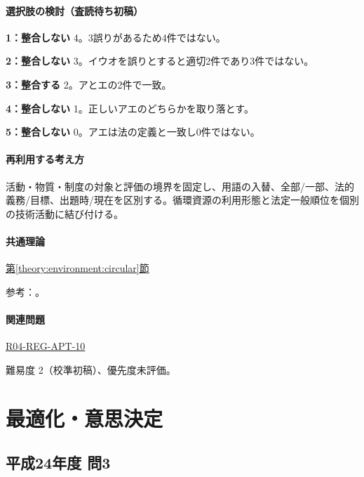 \paragraph{選択肢の検討（査読待ち初稿）}\mbox{}\par

\noindent\textbf{1：整合しない} 4。3誤りがあるため4件ではない。\par

\noindent\textbf{2：整合しない} 3。イウオを誤りとすると適切2件であり3件ではない。\par

\noindent\textbf{3：整合する} 2。アとエの2件で一致。\par

\noindent\textbf{4：整合しない} 1。正しいアエのどちらかを取り落とす。\par

\noindent\textbf{5：整合しない} 0。アエは法の定義と一致し0件ではない。\par

\paragraph{再利用する考え方} 活動・物質・制度の対象と評価の境界を固定し、用語の入替、全部/一部、法的義務/目標、出題時/現在を区別する。循環資源の利用形態と法定一般順位を個別の技術活動に結び付ける。

\paragraph{共通理論} \hyperref[theory:environment:circular]{第\ref*{theory:environment:circular}節}

\par 参考：\cite{env_circular_law}。

\paragraph{関連問題} \hyperref[q:r04-reg-apt-10]{R04-REG-APT-10}

\par 難易度 2（校準初稿）、優先度未評価。

\section{最適化・意思決定}

\subsection{平成24年度 問3}
\label{q:h24-reg-apt-03}

